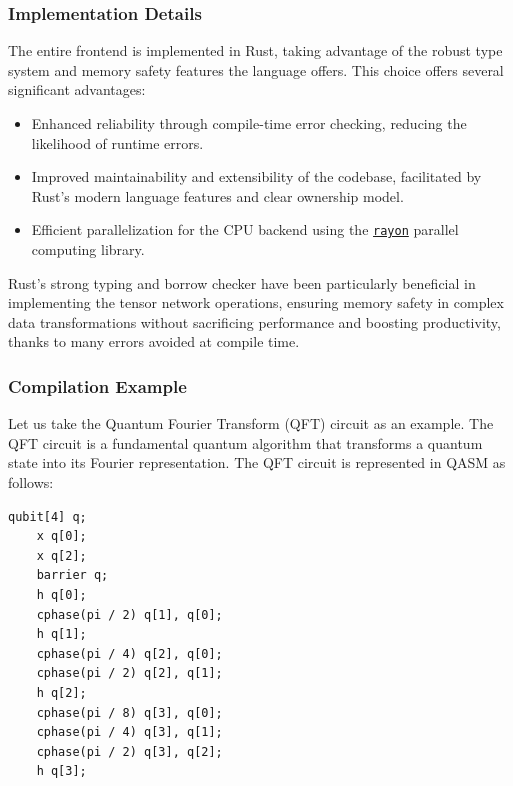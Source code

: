 \documentclass[12pt,oneside,a4paper]{article}
\begin{document}
\subsubsection{Implementation Details}

The entire frontend is implemented in Rust, taking advantage of the robust type system and memory safety features the language offers. This choice offers several significant advantages:

\begin{itemize}
    \item Enhanced reliability through compile-time error checking, reducing the likelihood of runtime errors.
    \item Improved maintainability and extensibility of the codebase, facilitated by Rust's modern language features and clear ownership model.
    \item Efficient parallelization for the CPU backend using the \href{https://github.com/rayon-rs/rayon}{\texttt{rayon}} parallel computing library.
\end{itemize}

Rust's strong typing and borrow checker have been particularly beneficial in implementing the tensor network operations, ensuring memory safety in complex data transformations without sacrificing performance and boosting productivity, thanks to many errors avoided at compile time.

\subsubsection{Compilation Example}

Let us take the Quantum Fourier Transform (QFT)\cite{coppersmith2002approximatefouriertransformuseful} circuit as an example. The QFT circuit is a fundamental quantum algorithm that transforms a quantum state into its Fourier representation. The QFT circuit is represented in QASM as follows:

\begin{lstlisting}[style=qasm, caption={QFT Circuit in QASM}]
	qubit[4] q;
	x q[0];
	x q[2];
	barrier q;
	h q[0];
	cphase(pi / 2) q[1], q[0];
	h q[1];
	cphase(pi / 4) q[2], q[0];
	cphase(pi / 2) q[2], q[1];
	h q[2];
	cphase(pi / 8) q[3], q[0];
	cphase(pi / 4) q[3], q[1];
	cphase(pi / 2) q[3], q[2];
	h q[3];
\end{lstlisting}

\end{document}
